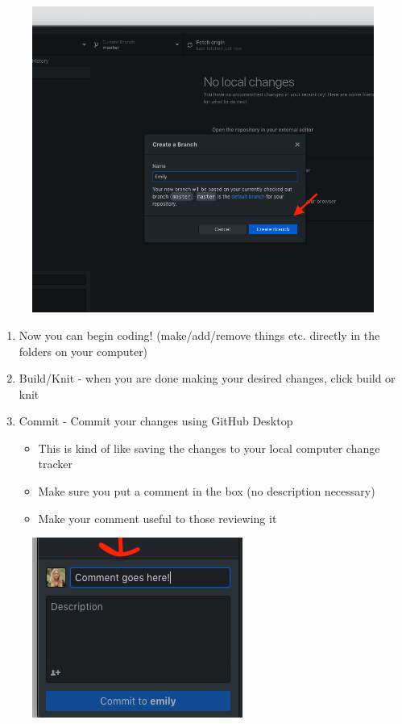 \documentclass[]{book}
\providecommand{\tightlist}{%
  \setlength{\itemsep}{0pt}\setlength{\parskip}{0pt}}
\begin{document}
\begin{figure}
\centering
\includegraphics{images/research_protocols/github/29.png}
\caption{}
\end{figure}

\begin{enumerate}
\def\labelenumi{\arabic{enumi}.}
\setcounter{enumi}{2}
\item
  Now you can begin coding! (make/add/remove things etc. directly in the folders on your computer)
\item
  Build/Knit - when you are done making your desired changes, click build or knit
\item
  Commit - Commit your changes using GitHub Desktop

  \begin{itemize}
  \tightlist
  \item
    This is kind of like saving the changes to your local computer change tracker
  \item
    Make sure you put a comment in the box (no description necessary)
  \item
    Make your comment useful to those reviewing it
  \end{itemize}
\end{enumerate}

\begin{figure}
\centering
\includegraphics{images/research_protocols/github/25.png}
\caption{}
\end{figure}
\end{document}
